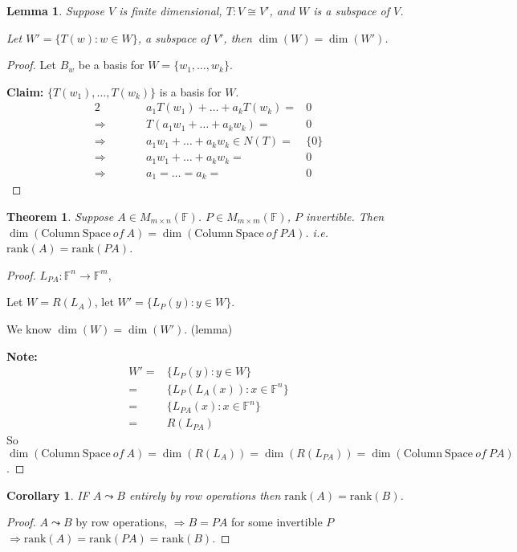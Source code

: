 \documentclass[12pt]{article}
\newtheorem{theorem}{Theorem}[subsection]
\newtheorem{lemma}{Lemma}[subsection]
\newtheorem{corollary}{Corollary}[subsection]
\newcommand{\rank}{\mathrm{rank}}
\newcommand{\ColSpace}{\mathrm{Column \ Space}}
\newcommand{\mF}{{\mathbb{F}}}
\begin{document}
\begin{lemma}
	Suppose $V$ is finite dimensional, $T:V\cong V'$, and $W$ is a subspace of
	$V$. 

	Let $W' = \{T(w) : w \in W\}$, a subspace of $V'$, then $\dim(W) = \dim(W')$.
\end{lemma}
\begin{proof}
	Let $B_w$ be a basis for $W = \{w_1, \ldots, w_k\}$. 

	\textbf{Claim:} $\{T(w_1), \ldots, T(w_k)\}$ is a basis for $W$. 
	\begin{alignat*}{2}
		& & a_1T(w_1) + \ldots + a_kT(w_k) =& 0\\
		\Rightarrow &\qquad & T(a_1w_1 + \ldots + a_kw_k) =& 0\\
		\Rightarrow &\qquad & a_1w_1 + \ldots + a_kw_k \in N(T) =& \{0\} \\
		\Rightarrow &\qquad & a_1w_1 + \ldots + a_kw_k =& 0\\
		\Rightarrow &\qquad & a_1 = \ldots = a_k =& 0
	\end{alignat*}
\end{proof}

\begin{theorem}
	Suppose $A \in M_{m\times n} (\mF)$. $P\in M_{m\times m}(\mF)$, $P$ 
	invertible. Then $\dim(\ColSpace \ of \ A) = \dim(\ColSpace \ of \ PA)$. 
	i.e. $\rank(A) = \rank(PA)$. 
\end{theorem}
\begin{proof}
	$L_{PA} : \mF^n \to \mF^m$,

	Let $W = R(L_A)$, let $W' = \{L_P(y): y \in W\}$. 

	We know $\dim(W) = \dim(W')$. (lemma)
	
	\textbf{Note:} 
	\begin{align*}
		W' =& \{L_P(y) : y \in W\}	\\
		=& \{L_P(L_A(x)): x \in \mF^n\}	\\
		=& \{L_{PA}(x): x \in \mF^n\}	\\
		=& R(L_{PA}) 
	\end{align*}
	So $\dim(\ColSpace \ of \ A) = \dim(R(L_A)) = \dim(R(L_{PA}))
	= \dim(\ColSpace \ of \ PA)$. 
\end{proof}


\begin{corollary}
	IF $A \leadsto B$ entirely by row operations then $\rank(A) = \rank(B)$. 
\end{corollary}
\begin{proof}
	$A \leadsto B$ by row operations, $\Rightarrow B = PA$ for some invertible
	$P$ $\Rightarrow \rank(A) = \rank(PA) = \rank(B)$. 
\end{proof}
\end{document}
